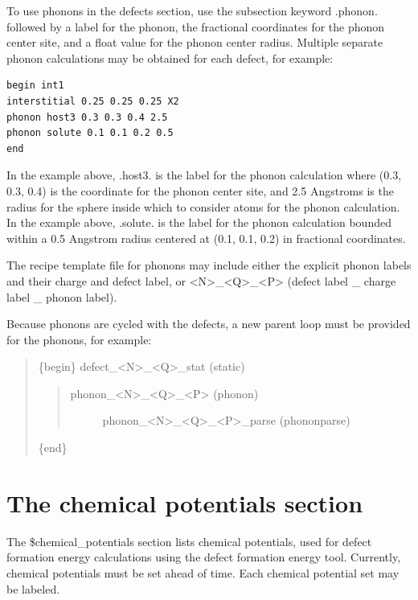 \documentclass[letterpaper,10pt,english]{sphinxmanual}
\begin{document}
To use phonons in the defects section, use the subsection keyword .phonon. followed by a label for the phonon, the fractional coordinates for the phonon center site, and a float value for the phonon center radius. Multiple separate phonon calculations may be obtained for each defect, for example:

\begin{Verbatim}[commandchars=\\\{\}]
begin int1
interstitial 0.25 0.25 0.25 X2
phonon host3 0.3 0.3 0.4 2.5
phonon solute 0.1 0.1 0.2 0.5
end
\end{Verbatim}

In the example above, .host3. is the label for the phonon calculation where (0.3, 0.3, 0.4) is the coordinate for the phonon center site, and 2.5 Angstroms is the radius for the sphere inside which to consider atoms for the phonon calculation. In the example above, .solute. is the label for the phonon calculation bounded within a 0.5 Angstrom radius centered at (0.1, 0.1, 0.2) in fractional coordinates.

The recipe template file for phonons may include either the explicit phonon labels and their charge and defect label, or \textless{}N\textgreater{}\_\textless{}Q\textgreater{}\_\textless{}P\textgreater{} (defect label \_ charge label \_ phonon label).

Because phonons are cycled with the defects, a new parent loop must be provided for the phonons, for example:
\begin{quote}

\{begin\}
defect\_\textless{}N\textgreater{}\_\textless{}Q\textgreater{}\_stat (static)
\begin{quote}
\begin{description}
\item[{phonon\_\textless{}N\textgreater{}\_\textless{}Q\textgreater{}\_\textless{}P\textgreater{} (phonon)}] \leavevmode
phonon\_\textless{}N\textgreater{}\_\textless{}Q\textgreater{}\_\textless{}P\textgreater{}\_parse (phononparse)

\end{description}
\end{quote}

\{end\}
\end{quote}


\section{The chemical potentials section}
\label{3_0_inputfile:the-chemical-potentials-section}
The \$chemical\_potentials section lists chemical potentials, used for defect formation energy calculations using the defect formation energy tool.
Currently, chemical potentials must be set ahead of time. Each chemical potential set may be labeled.
\end{document}
